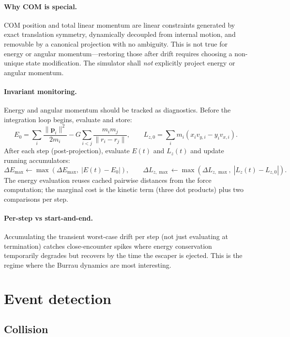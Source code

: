 \documentclass[11pt]{report}
\begin{document}
\paragraph{Why COM is special.} COM position and total linear momentum are linear constraints generated by exact translation symmetry, dynamically decoupled from internal motion, and removable by a canonical projection with no ambiguity. This is not true for energy or angular momentum---restoring those after drift requires choosing a non-unique state modification. The simulator shall \emph{not} explicitly project energy or angular momentum.

\paragraph{Invariant monitoring.} Energy and angular momentum should be tracked as diagnostics. Before the integration loop begins, evaluate and store:
\[
E_0 = \sum_i \frac{\|\mathbf p_i\|^2}{2m_i} - G\sum_{i<j}\frac{m_i m_j}{\|r_i - r_j\|}, \qquad L_{z,0} = \sum_i m_i(x_i v_{y,i} - y_i v_{x,i}).
\]
After each step (post-projection), evaluate $E(t)$ and $L_z(t)$ and update running accumulators:
\[
\Delta E_{\max} \leftarrow \max(\Delta E_{\max},\; |E(t) - E_0|), \qquad \Delta L_{z,\max} \leftarrow \max(\Delta L_{z,\max},\; |L_z(t) - L_{z,0}|).
\]
The energy evaluation reuses cached pairwise distances from the force computation; the marginal cost is the kinetic term (three dot products) plus two comparisons per step.

\paragraph{Per-step vs start-and-end.} Accumulating the transient worst-case drift per step (not just evaluating at termination) catches close-encounter spikes where energy conservation temporarily degrades but recovers by the time the escaper is ejected. This is the regime where the Burrau dynamics are most interesting.

\section{Event detection}
\label{sec:events}

\subsection{Collision}
\end{document}
